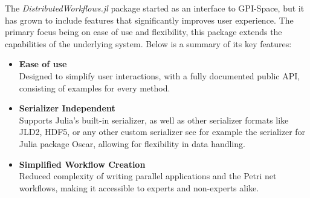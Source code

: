 \documentclass{juliacon}
\begin{document}
The \emph{DistributedWorkflows.jl} package started as an interface to GPI-Space\cite{GSPC}, but it has grown to include features that significantly improves user experience.
The primary focus being on ease of use and flexibility, this package extends the capabilities of the underlying system.
Below is a summary of its key features:

\begin{itemize}
    \item \textbf{Ease of use}\\
          Designed to simplify user interactions, with a fully documented public API, consisting of examples for every method.\vskip 6pt
    \item \textbf{Serializer Independent}\\
          Supports Julia's built-in serializer, as well as other serializer formats like JLD2\cite{JLD2}, HDF5\cite{HDF5}, or any other custom serializer see for example the serializer for Julia package Oscar\cite{OSCAR}, allowing for flexibility in data handling.\vskip 6pt
    \item \textbf{Simplified Workflow Creation}\\
          Reduced complexity of writing parallel applications and the Petri net workflows, making it accessible to experts and non-experts alike.\vskip 6pt
    

\end{itemize}
\end{document}
